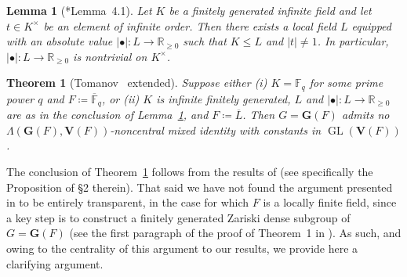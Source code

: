 \documentclass[a4paper,12pt]{amsproc}
\newcommand{\norm}[1]{\left\lvert#1\right\rvert}%
\DeclareMathOperator{\GL}{GL}%
\theoremstyle{plain}
\newtheorem{theorem}[definition]{Theorem}
\newtheorem{lemma}[definition]{Lemma}
\theoremstyle{definition}
\begin{document}
\begin{lemma}[\cite{tits1972free}*{Lemma~4.1}]\label{lem:tits_lem}
Let $K$ be a finitely generated infinite field and let $t\in K^\times$ be an element of infinite order. Then there exists a local field $L$ equipped with an absolute value $\norm{\bullet}\colon L\to\mathbb{R}_{\geq 0}$ such that $K\leq L$ and $\norm{t}\neq 1$. 
In particular, $\norm{\bullet}\colon L\to\mathbb{R}_{\geq 0}$ 
is nontrivial on $K^\times$.
\end{lemma}

\begin{theorem}[Tomanov~\cite{tomanov1985generalized} extended]\label{thm:no_mxd_ids_qsmpl_alg_grps}
Suppose either (i) $K=\mathbb{F}_q$ for some prime power $q$ and $F\coloneqq\overline{\mathbb{F}}_q$, or (ii) $K$ is infinite finitely generated, 
$L$ and $\norm{\bullet}\colon L\to\mathbb{R}_{\geq 0}$ are as in the conclusion 
of Lemma~\ref{lem:tits_lem}, and 
$F\coloneqq\overline{L}$. Then $G=\mathbf{G}(F)$ admits no $\Lambda(\mathbf{G}(F),\mathbf{V}(F))$-noncentral mixed identity with constants in $\GL(\mathbf{V}(F))$.
\end{theorem}

The conclusion of Theorem~\ref{thm:no_mxd_ids_qsmpl_alg_grps} follows from the results of \cite{tomanov1985generalized} (see specifically the Proposition of \S 2 therein). 
That said we have not found the argument presented in \cite{tomanov1985generalized} 
to be entirely transparent, in the case for which $F$ is a locally finite field, 
since a key step is to construct a finitely generated Zariski dense 
subgroup of $G = \mathbf{G}(F)$ (see the first paragraph of the proof of Theorem~1 
in \cite{tomanov1985generalized}). 
As such, and owing to the centrality of this argument to our results, 
we provide here a clarifying argument.
    
\end{document}
